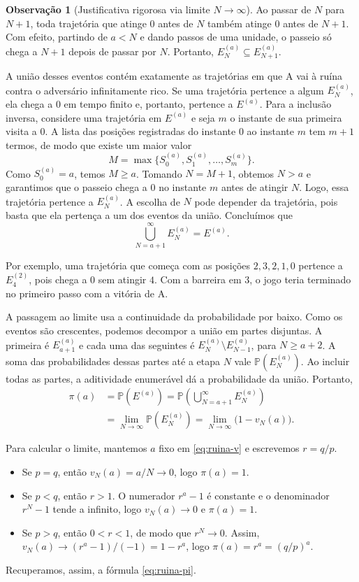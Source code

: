 \documentclass[12pt,portuguese]{article}
\theoremstyle{definition}
\newtheorem{remark}[remark]{Observação}
\theoremstyle{plainexercise}
\theoremstyle{starredexercise}
\theoremstyle{definition}
\begin{document}
\begin{remark}[Justificativa rigorosa via limite $N \to \infty$]
  Ao passar de $N$ para $N + 1$, toda trajetória que atinge $0$ antes de
  $N$ também atinge $0$ antes de $N + 1$. Com efeito, partindo de $a < N$
  e dando passos de uma unidade, o passeio só chega a $N + 1$ depois de
  passar por $N$. Portanto, $E_N^{(a)} \subseteq E_{N+1}^{(a)}$.

  A união desses eventos contém exatamente as trajetórias em que A vai à
  ruína contra o adversário infinitamente rico. Se uma trajetória pertence a
  algum $E_N^{(a)}$, ela chega a $0$ em tempo finito e, portanto, pertence a
  $E^{(a)}$. Para a inclusão inversa, considere uma trajetória em $E^{(a)}$
  e seja $m$ o instante de sua primeira visita a $0$. A lista das posições
  registradas do instante $0$ ao instante $m$ tem $m + 1$ termos, de modo
  que existe um maior valor
  \[
    M = \max\{S_0^{(a)}, S_1^{(a)}, \ldots, S_m^{(a)}\}.
  \]
  Como $S_0^{(a)} = a$, temos $M \geqslant a$. Tomando $N = M + 1$,
  obtemos $N > a$ e garantimos que o passeio chega a $0$ no instante $m$
  antes de atingir $N$.
  Logo, essa trajetória pertence a $E_N^{(a)}$. A escolha de $N$ pode
  depender da trajetória, pois basta que ela pertença a um dos eventos da
  união. Concluímos que
  \[
    \bigcup_{N = a + 1}^{\infty} E_N^{(a)} = E^{(a)}.
  \]

  Por exemplo, uma trajetória que começa com as posições $2, 3, 2, 1, 0$
  pertence a $E_4^{(2)}$, pois chega a $0$ sem atingir $4$. Com a barreira
  em $3$, o jogo teria terminado no primeiro passo com a vitória de A.

  A passagem ao limite usa a continuidade da probabilidade por baixo.
  Como os eventos são crescentes, podemos decompor a união em partes
  disjuntas. A primeira é $E_{a+1}^{(a)}$ e cada uma das seguintes é
  $E_N^{(a)} \setminus E_{N-1}^{(a)}$, para $N \geqslant a + 2$. A soma
  das probabilidades dessas partes até a etapa $N$ vale
  $\mathbb{P}(E_N^{(a)})$. Ao incluir todas as partes, a aditividade
  enumerável dá a probabilidade da união. Portanto,
  \[
    \begin{aligned}
      \pi(a) &= \mathbb{P}(E^{(a)})
              = \mathbb{P}\left(\bigcup_{N = a + 1}^{\infty} E_N^{(a)}\right) \\
             &= \lim_{N \to \infty} \mathbb{P}(E_N^{(a)})
              = \lim_{N \to \infty} \bigl(1 - v_N(a)\bigr).
    \end{aligned}
  \]

  Para calcular o limite, mantemos $a$ fixo em \eqref{eq:ruina-v} e
  escrevemos $r = q/p$.
  \begin{itemize}
    \item Se $p = q$, então $v_N(a) = a/N \to 0$, logo $\pi(a) = 1$.
    \item Se $p < q$, então $r > 1$. O numerador $r^a - 1$ é constante e
    o denominador $r^N - 1$ tende a infinito, logo $v_N(a) \to 0$ e
    $\pi(a) = 1$.
    \item Se $p > q$, então $0 < r < 1$, de modo que $r^N \to 0$. Assim,
    $v_N(a) \to (r^a - 1)/(-1) = 1 - r^a$, logo $\pi(a) = r^a = (q/p)^a$.
  \end{itemize}
  Recuperamos, assim, a fórmula \eqref{eq:ruina-pi}.
\end{remark}
\end{document}
